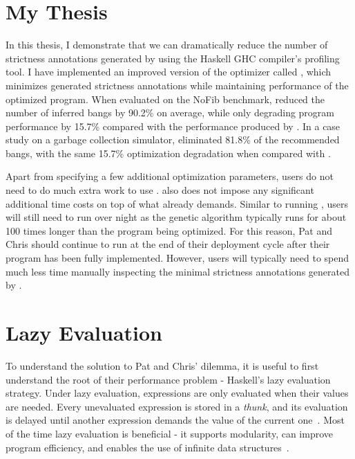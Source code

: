 
\section{My Thesis}

In this thesis, I demonstrate that we can dramatically reduce the number of
strictness annotations generated by \Ao{} using the Haskell GHC compiler's
profiling tool. I have implemented an improved version of the optimizer
called \At{}, which minimizes generated strictness annotations while
maintaining performance of the optimized program. When evaluated on the NoFib
benchmark, \At{} reduced the number of inferred bangs by 90.2\% on average,
while only degrading program performance by 15.7\% compared with the
performance produced by \Ao{}. In a case study on a garbage collection simulator,
\At{} eliminated 81.8\% of the recommended bangs,  with the
same 15.7\% optimization degradation when compared with \Ao{}.

Apart from specifying a few additional optimization parameters, users
do not need to do much extra work to use \At{}. \At{} also does not impose any
significant additional time costs on top of what \Ao{} already demands. Similar
to running \Ao{}, users will still need to run \At{} over night as the
genetic algorithm typically runs for about 100 times longer than the program
being optimized. For this reason, Pat and Chris should continue to run
\At{} at the end of their deployment cycle after their program has been fully
implemented. However, users will typically need to spend much less time manually inspecting the minimal strictness annotations generated
by \At{}.


\section{Lazy Evaluation}

To understand the solution to Pat and Chris' dilemma, it is useful to
first understand the root of their performance problem - Haskell's lazy
evaluation strategy. Under lazy evaluation, expressions are
only evaluated when their values are needed. Every unevaluated
expression is stored in a \textit{thunk}, and its evaluation is
delayed until another expression demands the value of the current
one~\cite{PeytonJones89}. Most of the time lazy evaluation is beneficial -
it supports modularity, can improve program efficiency, and enables
the use of infinite data structures~\cite{Hughes89}.

